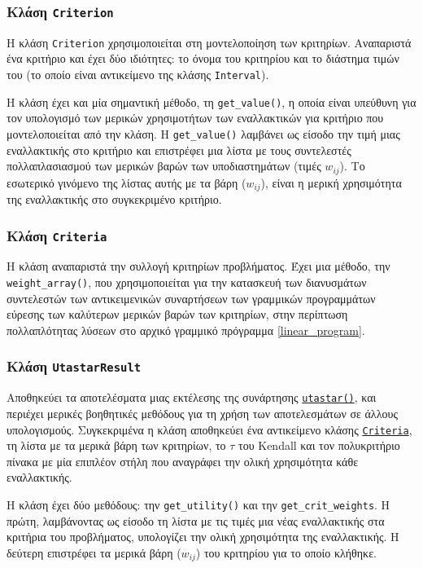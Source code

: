 \documentclass[11pt,a4paper,titlepage]{article}
\numberwithin{equation}{section}
\begin{document}
\subsubsection{Κλάση \texttt{Criterion}}
\label{sssec:Criterion}
Η κλάση \texttt{Criterion} χρησιμοποιείται στη μοντελοποίηση των κριτηρίων. Αναπαριστά ένα κριτήριο και έχει δύο ιδιότητες: το όνομα του κριτηρίου και το διάστημα τιμών του (το οποίο είναι αντικείμενο της κλάσης \texttt{Interval}).

Η κλάση έχει και μία σημαντική μέθοδο, τη \hypertarget{method:getvalue}{\texttt{get\_value()}}, η οποία είναι υπεύθυνη για τον υπολογισμό των μερικών χρησιμοτήτων των εναλλακτικών για κριτήριο που μοντελοποιείται από την κλάση. Η \texttt{get\_value()} λαμβάνει ως είσοδο την τιμή μιας εναλλακτικής στο κριτήριο και επιστρέφει μια λίστα με τους συντελεστές πολλαπλασιασμού των μερικών βαρών των υποδιαστημάτων (τιμές $ w_{ij} $). Tο εσωτερικό γινόμενο της λίστας αυτής με τα βάρη ($ w_{ij} $), είναι η μερική χρησιμότητα της εναλλακτικής στο συγκεκριμένο κριτήριο.

\subsubsection{Κλάση \texttt{Criteria}}
\label{sssec:Criteria}
Η κλάση αναπαριστά την συλλογή κριτηρίων προβλήματος. Έχει μια μέθοδο, την \texttt{weight\_array()}, που χρησιμοποιείται για την κατασκευή των διανυσμάτων συντελεστών των αντικειμενικών συναρτήσεων των γραμμικών προγραμμάτων εύρεσης των καλύτερων μερικών βαρών των κριτηρίων, στην περίπτωση πολλαπλότητας λύσεων στο αρχικό γραμμικό πρόγραμμα \eqref{linear_program}.

\subsubsection{Κλάση \texttt{UtastarResult}}
\label{sssec:UtastarResult}
Αποθηκεύει τα αποτελέσματα μιας εκτέλεσης της συνάρτησης \hyperref[sssec:utastar()]{\texttt{utastar()}}, και περιέχει μερικές βοηθητικές μεθόδους για τη χρήση των αποτελεσμάτων σε άλλους υπολογισμούς. 
Συγκεκριμένα η κλάση αποθηκεύει ένα αντικείμενο κλάσης \hyperref[sssec:UtastarResult]{\texttt{Criteria}}, τη λίστα με τα μερικά βάρη των κριτηρίων, το $ \tau $ του Kendall και τον πολυκριτήριο πίνακα με μία επιπλέον στήλη που αναγράφει την ολική χρησιμότητα κάθε εναλλακτικής.

Η κλάση έχει δύο μεθόδους: την \texttt{get\_utility()} και την \texttt{get\_crit\_weights}. H πρώτη, λαμβάνοντας ως είσοδο τη λίστα με τις τιμές μια νέας εναλλακτικής στα κριτήρια του προβλήματος, υπολογίζει την ολική χρησιμότητα της εναλλακτικής. Η δεύτερη επιστρέφει τα μερικά βάρη ($ w_{ij} $) του κριτηρίου για το οποίο κλήθηκε.
\end{document}
